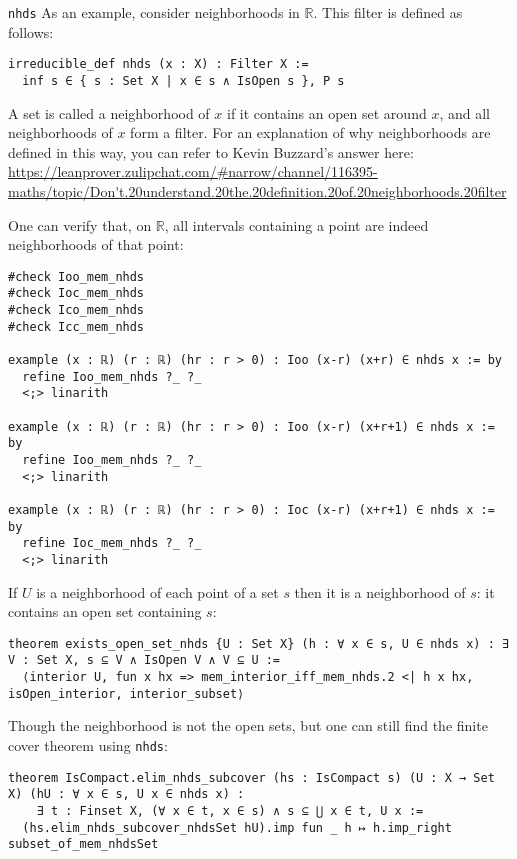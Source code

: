 \documentclass[a4paper]{article}
\begin{document}
\begin{xmp}{\texttt{nhds}}
As an example, consider neighborhoods in \(\mathbb{R}\). This filter is defined as follows:
\begin{lstlisting}[style=lean]
irreducible_def nhds (x : X) : Filter X :=
  inf s ∈ { s : Set X | x ∈ s ∧ IsOpen s }, P s
\end{lstlisting}
A set is called a neighborhood of $x$ if it contains an open set around $x$, and all neighborhoods of \(x\) form a filter. For an explanation of why neighborhoods are defined in this way, you can refer to Kevin Buzzard’s answer here:
\url{https://leanprover.zulipchat.com/#narrow/channel/116395-maths/topic/Don't.20understand.20the.20definition.20of.20neighborhoods.20filter}

One can verify that, on \(\mathbb{R}\), all intervals containing a point are indeed neighborhoods of that point:
\begin{lstlisting}[style = lean]
#check Ioo_mem_nhds
#check Ioc_mem_nhds
#check Ico_mem_nhds
#check Icc_mem_nhds

example (x : ℝ) (r : ℝ) (hr : r > 0) : Ioo (x-r) (x+r) ∈ nhds x := by
  refine Ioo_mem_nhds ?_ ?_
  <;> linarith

example (x : ℝ) (r : ℝ) (hr : r > 0) : Ioo (x-r) (x+r+1) ∈ nhds x := by
  refine Ioo_mem_nhds ?_ ?_
  <;> linarith

example (x : ℝ) (r : ℝ) (hr : r > 0) : Ioc (x-r) (x+r+1) ∈ nhds x := by
  refine Ioc_mem_nhds ?_ ?_
  <;> linarith

\end{lstlisting} 
If $U$ is a neighborhood of each point of a set $s$ then it is a neighborhood of $s$: it contains an open set containing $s$:
\begin{lstlisting}[style = lean]
theorem exists_open_set_nhds {U : Set X} (h : ∀ x ∈ s, U ∈ nhds x) : ∃ V : Set X, s ⊆ V ∧ IsOpen V ∧ V ⊆ U :=
  ⟨interior U, fun x hx => mem_interior_iff_mem_nhds.2 <| h x hx, isOpen_interior, interior_subset⟩
\end{lstlisting}
Though the neighborhood is not the open sets, but one can still find the finite cover theorem using \texttt{nhds}:
\begin{lstlisting}[style = lean]
theorem IsCompact.elim_nhds_subcover (hs : IsCompact s) (U : X → Set X) (hU : ∀ x ∈ s, U x ∈ nhds x) :
    ∃ t : Finset X, (∀ x ∈ t, x ∈ s) ∧ s ⊆ ⋃ x ∈ t, U x :=
  (hs.elim_nhds_subcover_nhdsSet hU).imp fun _ h ↦ h.imp_right subset_of_mem_nhdsSet
\end{lstlisting}

\end{xmp}
\end{document}
